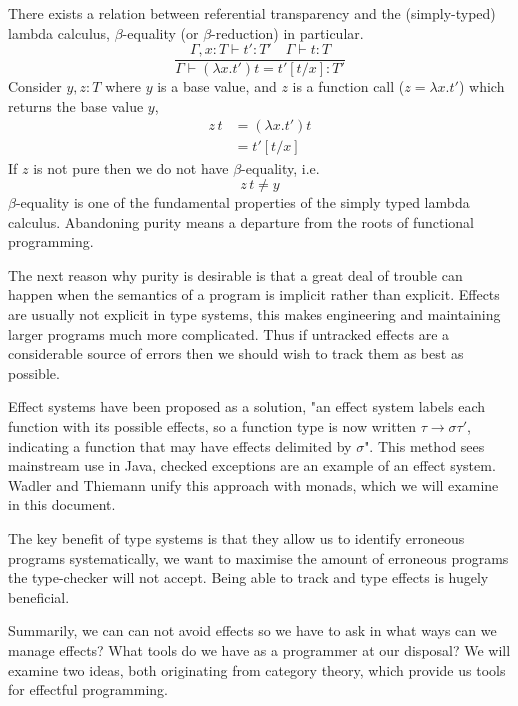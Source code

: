 There exists a relation between referential transparency and
the (simply-typed) lambda calculus,
$\beta$-equality (or $\beta$-reduction) in particular.
\begin{equation}
\frac
{\Gamma, x : T \vdash t\prime : T\prime \quad \Gamma \vdash t : T}
{\Gamma \vdash (\lambda x.t\prime)t = t\prime[t/x]: T\prime }
\end{equation}
Consider $y, z : T$ where $y$ is a base value,
and $z$ is a function call ($z = \lambda x.t\prime$)
which returns the base value $y$,
\begin{align}
    z\,t &= (\lambda x.t\prime)t \\
         &= t\prime[t/x]
\end{align}
If $z$ is not pure then we do not have $\beta$-equality, i.e.
\begin{equation}
    z\,t \neq y
\end{equation}
$\beta$-equality is one of the fundamental properties
of the simply typed lambda calculus.
Abandoning purity means a departure from
the roots of functional programming.

The next reason why purity is desirable is that
a great deal of trouble can happen when the semantics
of a program is implicit rather than explicit.
Effects are usually not explicit in type systems,
this makes engineering and
maintaining larger programs
much more complicated.
Thus if untracked effects are a considerable source of errors then we should
wish to track them as best as possible.

Effect systems\cite{jouvelot1991algebraic} have been proposed as a solution,
"an effect system labels each function with its possible effects,
so a function type is now written $\tau \rightarrow \sigma \tau\prime$,
indicating a function that may have effects delimited by $\sigma$".
This method sees mainstream use in Java,
checked exceptions are an example of an effect system.
Wadler and Thiemann\cite{wadler2003marriage}
unify this approach with monads, which we will examine in this document.

The key benefit of type systems is that they allow us to identify erroneous programs
systematically,
we want to maximise the amount of erroneous programs the type-checker will not accept.
Being able to track and type effects is hugely beneficial.

Summarily, we can can not avoid effects so
we have to ask in what ways can we manage effects?
What tools do we have as a programmer at our disposal?
We will examine two ideas, both originating from category theory,
which provide us tools for effectful programming.
